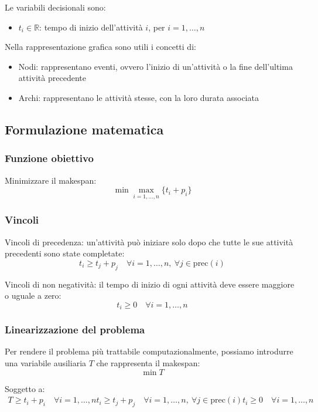 Le variabili decisionali sono:
\begin{itemize}
    \item $t_i \in \mathbb{R}$: tempo di inizio dell'attività $i$, per $i=1,\ldots,n$
\end{itemize}

Nella rappresentazione grafica sono utili i concetti di:
\begin{itemize}
    \item Nodi: rappresentano eventi, ovvero l'inizio di un'attività o la fine dell'ultima attività precedente
    \item Archi: rappresentano le attività stesse, con la loro durata associata
\end{itemize}

\subsection{Formulazione matematica}
\subsubsection{Funzione obiettivo}
Minimizzare il makespan:
\[ 
\min \max_{i=1,\dots,n} \{ t_i + p_i \}
\]

\subsubsection{Vincoli}
Vincoli di precedenza: un'attività può iniziare solo dopo che tutte le sue attività precedenti sono state completate:
\[ 
t_i \geq t_j + p_j \quad \forall i = 1,\dots,n,\ \forall j \in \text{prec}(i)
\]

Vincoli di non negatività: il tempo di inizio di ogni attività deve essere maggiore o uguale a zero:
\[ 
t_i \geq 0 \quad \forall i = 1,\dots,n
\]

\subsubsection{Linearizzazione del problema}
Per rendere il problema più trattabile computazionalmente, possiamo introdurre una variabile ausiliaria $T$ che rappresenta il makespan:
\[ 
\min T
\]

Soggetto a:
\[ 
\begin{aligned}
T \geq t_i + p_i \quad \forall i = 1,\dots,n
t_i \geq t_j + p_j \quad \forall i = 1,\dots,n,\ \forall j \in \text{prec}(i)
t_i \geq 0 \quad \forall i = 1,\dots,n
\end{aligned}
\]

